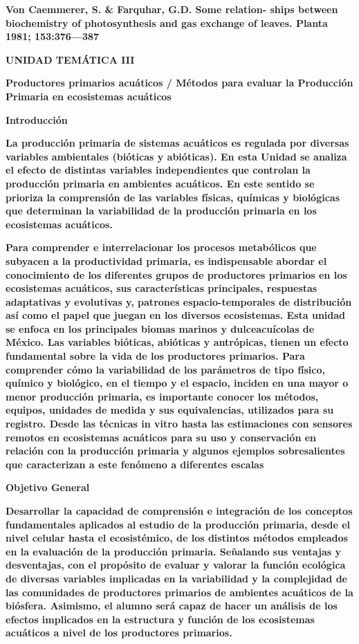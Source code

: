 \documentclass[
]{article}
\begin{document}
\textbf{Von Caemmerer, S. \& Farquhar, G.D. Some relation- ships between
biochemistry of photosynthesis and gas exchange of leaves. Planta 1981;
153:376---387}

\textbf{\hfill\break
}

\textbf{UNIDAD TEMÁTICA III}

\textbf{Productores primarios acuáticos / Métodos para evaluar la
Producción Primaria en ecosistemas acuáticos}

\textbf{Introducción}

\textbf{La producción primaria de sistemas acuáticos es regulada por
diversas variables ambientales (bióticas y abióticas). En esta Unidad se
analiza el efecto de distintas variables independientes que controlan la
producción primaria en ambientes acuáticos. En este sentido se prioriza
la comprensión de las variables físicas, químicas y biológicas que
determinan la variabilidad de la producción primaria en los ecosistemas
acuáticos.}

\textbf{Para comprender e interrelacionar los procesos metabólicos que
subyacen a la productividad primaria, es indispensable abordar el
conocimiento de los diferentes grupos de productores primarios en los
ecosistemas acuáticos, sus características principales, respuestas
adaptativas y evolutivas y, patrones espacio-temporales de distribución
así como el papel que juegan en los diversos ecosistemas. Esta unidad se
enfoca en los principales biomas marinos y dulceacuícolas de México. Las
variables bióticas, abióticas y antrópicas, tienen un efecto fundamental
sobre la vida de los productores primarios. Para comprender cómo la
variabilidad de los parámetros de tipo físico, químico y biológico, en
el tiempo y el espacio, inciden en una mayor o menor producción
primaria, es importante conocer los métodos, equipos, unidades de medida
y sus equivalencias, utilizados para su registro. Desde las técnicas in
vitro hasta las estimaciones con sensores remotos en ecosistemas
acuáticos para su uso y conservación en relación con la producción
primaria y algunos ejemplos sobresalientes que caracterizan a este
fenómeno a diferentes escalas}

\textbf{Objetivo General}

\textbf{Desarrollar la capacidad de comprensión e integración de los
conceptos fundamentales aplicados al estudio de la producción primaria,
desde el nivel celular hasta el ecosistémico, de los distintos métodos
empleados en la evaluación de la producción primaria. Señalando sus
ventajas y desventajas, con el propósito de evaluar y valorar la función
ecológica de diversas variables implicadas en la variabilidad y la
complejidad de las comunidades de productores primarios de ambientes
acuáticos de la biósfera. Asimismo, el alumno será capaz de hacer un
análisis de los efectos implicados en la estructura y función de los
ecosistemas acuáticos a nivel de los productores primarios.}
\end{document}
